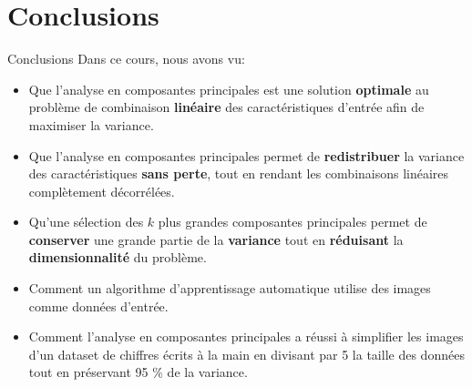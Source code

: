 \section{Conclusions}

\begin{frame}{Conclusions}
	Dans ce cours, nous avons vu:
	\begin{itemize}
		\item Que l'analyse en composantes principales est une solution \textbf{optimale} au problème de combinaison \textbf{linéaire} des caractéristiques d'entrée afin de maximiser la variance.
		\pause
		\item Que l'analyse en composantes principales permet de \textbf{redistribuer} la variance des caractéristiques \textbf{sans perte}, tout en rendant les combinaisons linéaires complètement décorrélées.
		\pause
		\item Qu'une sélection des $k$ plus grandes composantes principales permet de \textbf{conserver} une grande partie de la \textbf{variance} tout en \textbf{réduisant} la \textbf{dimensionnalité} du problème.
		\pause
		\item Comment un algorithme d'apprentissage automatique utilise des images comme données d'entrée.
		\pause
		\item Comment l'analyse en composantes principales a réussi à simplifier les images d'un dataset de chiffres écrits à la main en divisant par 5 la taille des données tout en préservant 95 \% de la variance.
	\end{itemize}
\end{frame}
